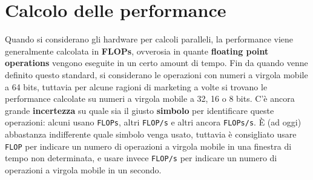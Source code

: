 \section{Calcolo delle performance}

Quando si considerano gli hardware per calcoli paralleli, la performance viene generalmente calcolata in \textbf{FLOPs}, ovverosia in quante \textbf{floating point operations} vengono eseguite in un certo amount di tempo. Fin da quando venne definito questo standard, si considerano le operazioni con numeri a virgola mobile a 64 bits, tuttavia per alcune ragioni di marketing a volte si trovano le performance calcolate su numeri a virgola mobile a 32, 16 o 8 bits.
\nl
C'è ancora grande \textbf{incertezza} su quale sia il giusto \textbf{simbolo} per identificare queste operazioni: alcuni usano \verb|FLOPs|, altri \verb|FLOP/s| e altri ancora \verb|FLOPs/s|. È (ad oggi) abbastanza indifferente quale simbolo venga usato, tuttavia è consigliato usare \verb|FLOP| per indicare un numero di operazioni a virgola mobile in una finestra di tempo non determinata, e usare invece \verb|FLOP/s| per indicare un numero di operazioni a virgola mobile in un secondo.
\nl
